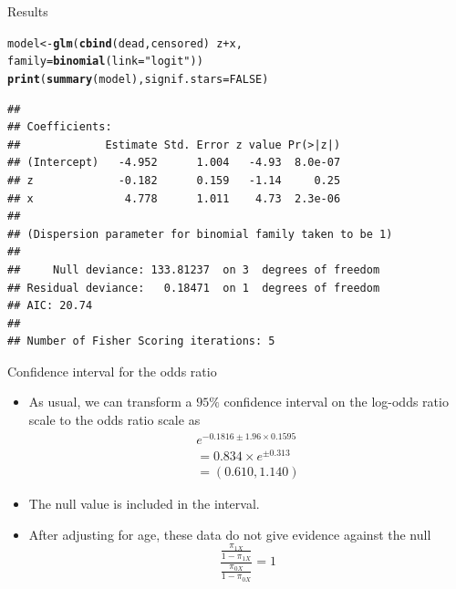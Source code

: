 \documentclass[10pt,handout]{beamer}\usepackage[]{graphicx}\usepackage[]{color}
\makeatletter
\newcommand{\hlnum}[1]{\textcolor[rgb]{0.686,0.059,0.569}{#1}}%
\newcommand{\hlstr}[1]{\textcolor[rgb]{0.192,0.494,0.8}{#1}}%
\newcommand{\hlopt}[1]{\textcolor[rgb]{0,0,0}{#1}}%
\newcommand{\hlstd}[1]{\textcolor[rgb]{0.345,0.345,0.345}{#1}}%
\newcommand{\hlkwb}[1]{\textcolor[rgb]{0.69,0.353,0.396}{#1}}%
\newcommand{\hlkwc}[1]{\textcolor[rgb]{0.333,0.667,0.333}{#1}}%
\newcommand{\hlkwd}[1]{\textcolor[rgb]{0.737,0.353,0.396}{\textbf{#1}}}%
\newenvironment{kframe}{%
 \def\at@end@of@kframe{}%
 \ifinner\ifhmode%
  \def\at@end@of@kframe{\end{minipage}}%
  \begin{minipage}{\columnwidth}%
 \fi\fi%
 \def\FrameCommand##1{\hskip\@totalleftmargin \hskip-\fboxsep
 \colorbox{shadecolor}{##1}\hskip-\fboxsep
     \hskip-\linewidth \hskip-\@totalleftmargin \hskip\columnwidth}%
 \MakeFramed {\advance\hsize-\width
   \@totalleftmargin\z@ \linewidth\hsize
   \@setminipage}}%
 {\par\unskip\endMakeFramed%
 \at@end@of@kframe}
\newenvironment{knitrout}{}{} %
\makeatother
\begin{document}
\begin{frame}[fragile]{Results}
\begin{knitrout}
\color{fgcolor}\begin{kframe}
\begin{alltt}
\hlstd{model} \hlkwb{<-} \hlkwd{glm}\hlstd{(}\hlkwd{cbind}\hlstd{(dead,censored)} \hlopt{~} \hlstd{z} \hlopt{+} \hlstd{x,}
              \hlkwc{family}\hlstd{=}\hlkwd{binomial}\hlstd{(}\hlkwc{link}\hlstd{=}\hlstr{"logit"}\hlstd{))}
\hlkwd{print}\hlstd{(}\hlkwd{summary}\hlstd{(model),} \hlkwc{signif.stars} \hlstd{=} \hlnum{FALSE}\hlstd{)}
\end{alltt}
\begin{verbatim}
## 
## Coefficients:
##             Estimate Std. Error z value Pr(>|z|)
## (Intercept)   -4.952      1.004   -4.93  8.0e-07
## z             -0.182      0.159   -1.14     0.25
## x              4.778      1.011    4.73  2.3e-06
## 
## (Dispersion parameter for binomial family taken to be 1)
## 
##     Null deviance: 133.81237  on 3  degrees of freedom
## Residual deviance:   0.18471  on 1  degrees of freedom
## AIC: 20.74
## 
## Number of Fisher Scoring iterations: 5
\end{verbatim}
\end{kframe}
\end{knitrout}
\end{frame}



\begin{frame}[fragile]{Confidence interval for the odds ratio}
	\begin{itemize}
		\item As usual, we can transform a $95 \%$ confidence interval on the log-odds ratio scale to the odds ratio scale as
		$$
		\begin{array}{l}
		e^{-0.1816 \pm 1.96 \times 0.1595} \\
		=0.834 \times e^{\pm 0.313} \\
		=(0.610,1.140)
		\end{array}
		$$
		\item The null value is included in the interval.
		\item After adjusting for age, these data do not give evidence against the null
		$$
		\frac{\frac{\pi_{1 X}}{1-\pi_{1 X}}}{\frac{\pi_{0 X}}{1-\pi_{0 X}}}=1
		$$
	\end{itemize}
\end{frame}
\end{document}
